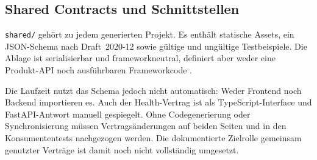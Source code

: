 \subsection{Shared Contracts und Schnittstellen}
\label{subsec:shared-contracts-schnittstellen}

\texttt{shared/} gehört zu jedem generierten Projekt. Es enthält statische
Assets, ein JSON-Schema nach Draft~2020-12 sowie gültige und ungültige
Testbeispiele. Die Ablage ist serialisierbar und frameworkneutral, definiert
aber weder eine Produkt-API noch ausführbaren Frameworkcode
\parencite{kleiveist2026architecture,kleiveist2026governance-snapshot}.

Die Laufzeit nutzt das Schema jedoch nicht automatisch: Weder Frontend noch
Backend importieren es. Auch der Health-Vertrag ist als TypeScript-Interface
und FastAPI-Antwort manuell gespiegelt. Ohne Codegenerierung oder
Synchronisierung müssen Vertragsänderungen auf beiden Seiten und in den
Konsumententests nachgezogen werden. Die dokumentierte Zielrolle gemeinsam
genutzter Verträge ist damit noch nicht vollständig umgesetzt.

